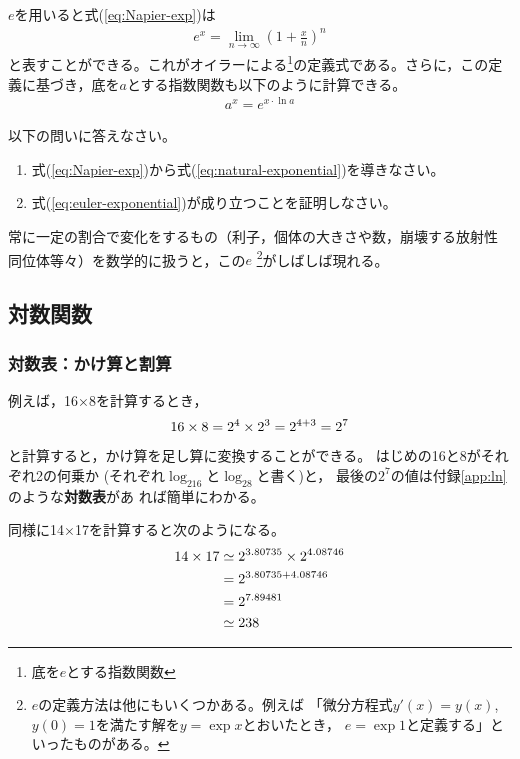 \documentclass[twocolumn,11pt]{jarticle}
\begin{document}
$e$を用いると式(\ref{eq:Napier-exp})は
\begin{align}
	\label{eq:natural-exponential}
	e^x = \lim_{n\to\infty} \left( 1 + \frac{x}{n} \right)^n
\end{align}
と表すことができる。これがオイラーによる\footnote{底を$e$とする指数関数}の定義式である。さらに，この定義に基づき，底を$a$とする指数関数も以下のように計算できる。
\begin{align}
	\label{eq:euler-exponential}
	a^x=e^{x\cdot \ln a}
\end{align}

\nquestion 以下の問いに答えなさい。
\begin{enumerate}
\item 式(\ref{eq:Napier-exp})から式(\ref{eq:natural-exponential})を導きなさい。
\item 式(\ref{eq:euler-exponential})が成り立つことを証明しなさい。
\end{enumerate}
\comment
常に一定の割合で変化をするもの（利子，個体の大きさや数，崩壊する放射性
同位体等々）を数学的に扱うと，この$e$
\footnote{$e$の定義方法は他にもいくつかある。例えば
「微分方程式$y'(x)=y(x)$, $y(0)=1$を満たす解を$y=\exp x$とおいたとき，
$e=\exp 1$と定義する」といったものがある。}がしばしば現れる。

\subsection{対数関数}

\subsubsection{対数表：かけ算と割算}
例えば，16×8を計算するとき，
\begin{align}
  16\times 8=2^4\times 2^3=2^{4+3}=2^7\notag
\end{align}
と計算すると，かけ算を足し算に変換することができる。
はじめの16と8がそれぞれ2の何乗か
(それぞれ$\log_216$と$\log_28$と書く)と，
最後の$2^7$の値は付録\ref{app:ln}のような\textbf{対数表}があ
れば簡単にわかる。

同様に14×17を計算すると次のようになる。
\begin{align}
  14\times 17&\simeq 2^{3.80735}\times 2^{4.08746}\notag\\
  &=2^{3.80735+4.08746}\notag\\
  &=2^{7.89481}\notag\\
  &\simeq 238\notag
\end{align}
\end{document}
